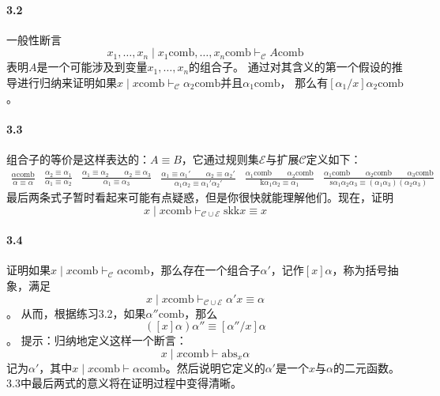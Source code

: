 \paragraph{3.2} 
一般性断言
$$x_1, \dots, x_n \mid x_1 \text{comb}, \dots, x_n \text{comb} \vdash_{\mathcal{C}} A \text{comb}$$
表明$A$是一个可能涉及到变量$x_1,\dots,x_n$的组合子。
通过对其含义的第一个假设的推导进行归纳来证明如果$x \mid x \text{comb} \vdash_{\mathcal{C}} \alpha_2 \text{comb}$并且$\alpha_1 \text{comb}$，
那么有$[\alpha_1 / x] \alpha_2 \text{comb}$。

\paragraph{3.3}
组合子的等价是这样表达的：$A\equiv B$，它通过规则集$\mathcal{E}$与扩展$\mathcal{C}$定义如下：
\begin{subequations}
    \begin{align}
        \frac{\alpha \text{comb}}{\alpha \equiv \alpha} 
    \end{align}
    \begin{align}
        \frac{\alpha_2 \equiv \alpha_1}{\alpha_1 \equiv \alpha_2} 
    \end{align}
    \begin{align}
        \frac{\alpha_1 \equiv \alpha_2 \qquad \alpha_2 \equiv \alpha_3}{\alpha_1 \equiv \alpha_3} 
    \end{align}
    \begin{align}
        \frac{\alpha_1 \equiv \alpha_1' \qquad \alpha_2 \equiv \alpha_2'}{\alpha_1 \alpha_2 \equiv \alpha_1'\alpha_2'} 
    \end{align}
    \begin{align}
        \frac{\alpha_1 \text{comb} \qquad \alpha_2 \text{comb}}{\text{k} \alpha_1 \alpha_2 \equiv \alpha_1} 
    \end{align}
    \begin{align}
        \frac{\alpha_1 \text{comb} \qquad \alpha_2 \text{comb} \qquad \alpha_3 \text{comb}}{\text{s} \alpha_1 \alpha_2 \alpha_3 \equiv (\alpha_1 \alpha_3)(\alpha_2 \alpha_3)} 
    \end{align}
\end{subequations}
最后两条式子暂时看起来可能有点疑惑，但是你很快就能理解他们。现在，证明
$$x \mid x \text{comb} \vdash_{\mathcal{C} \cup \mathcal{E}} \text{skk} x \equiv x$$

\paragraph{3.4}
证明如果$x \mid x \text{comb} \vdash_{\mathcal{C}} \alpha \text{comb}$，那么存在一个组合子$\alpha'$，记作$[x]\alpha$，称为括号抽象，满足
$$x \mid x \text{comb} \vdash_{\mathcal{C} \cup \mathcal{E}} \alpha' x \equiv \alpha$$。
从而，根据练习3.2，如果$\alpha'' \text{comb}$，那么
$$([x] \alpha) \alpha'' \equiv [\alpha'' / x] \alpha$$。
提示：归纳地定义这样一个断言：
$$x \mid x \text{comb} \vdash \text{abs}_x \alpha$$
记为$\alpha'$，其中$x \mid x \text{comb} \vdash \alpha \text{comb}$。然后说明它定义的$\alpha'$是一个$x$与$\alpha$的二元函数。
3.3中最后两式的意义将在证明过程中变得清晰。

